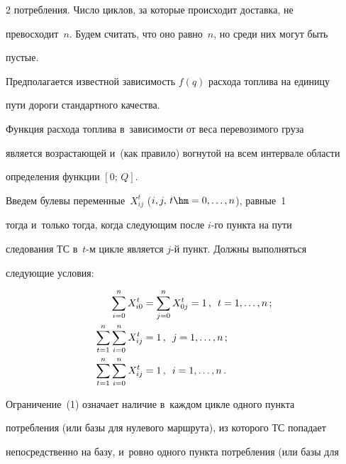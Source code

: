 \begin{multicols}{2}
потребления. Число циклов, за которые происходит доставка, не


превосходит~$n$. Будем считать, что оно равно~$n$, но среди них могут быть


пустые.





  Предполагается известной зависимость $f(q)$ расхода топлива на единицу


пути дороги стандартного качества.





  Функция расхода топлива в~зависимости от веса перевозимого груза


является возрастающей и~(как правило) вогнутой на всем интервале области


определения функции  $[0;\,Q]$.





  Введем булевы переменные~$X_{ij}^t$ ($i,j,\,t\hm=0, \ldots , n$), равные~1


тогда и~только тогда, когда следующим после $i$-го пункта на пути


следования ТС в~$t$-м цикле является $j$-й пункт. Должны выполняться


следующие условия:


  \begin{align}


  \sum\limits_{i=0}^n X^t_{i0} &= \sum\limits_{j=0}^n X^t_{0j} =1\,,\enskip


t=1,\ldots ,n\,;\label{e1-br}\\


  \sum\limits_{t=1}^n \sum\limits_{i=0}^n X_{ij}^t &=1\,,\enskip j=1,\ldots,


n\,;\label{e2-br}\\


  \sum\limits_{t=1}^n \sum\limits_{i=0}^n X_{ij}^t &=1\,,\enskip i=1,\ldots, n\,.


  \label{e3-br}


  \end{align}





  Ограничение~(1) означает наличие в~каждом цик\-ле одного пункта


потребления (или базы для нулевого маршрута), из которого ТС попадает


непосредственно на базу, и~ровно одного пункта потребления (или базы для



\end{multicols}
